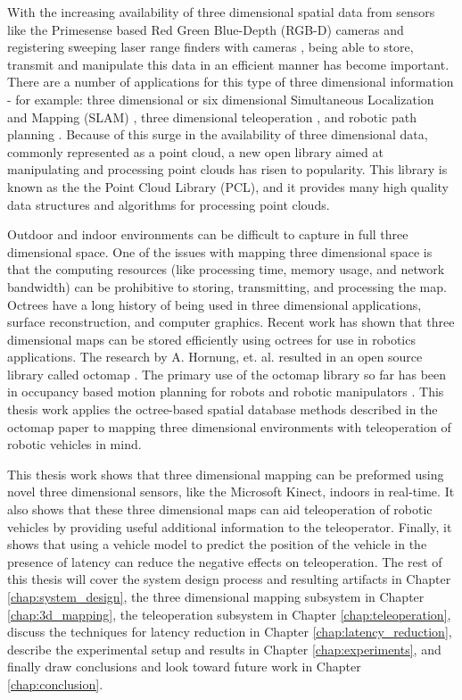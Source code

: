\documentclass[12pt]{report}
\begin{document}
With the increasing availability of three dimensional spatial data from sensors like the Primesense based Red Green Blue-Depth (RGB-D) cameras \cite{PRIMESENSE} and registering sweeping laser range finders with cameras \cite{photo_real}, being able to store, transmit and manipulate this data in an efficient manner has become important.  There are a number of applications for this type of three dimensional information - for example: three dimensional or six dimensional Simultaneous Localization and Mapping (SLAM) \cite{biswasdepth}, three dimensional teleoperation \cite{photo_real}, and robotic path planning \cite{3DCOLLISION}.  Because of this surge in the availability of three dimensional data, commonly represented as a point cloud, a new open library aimed at manipulating and processing point clouds has risen to popularity.  This library is known as the the Point Cloud Library (PCL)\cite{rusu20113d}, and it provides many high quality data structures and algorithms for processing point clouds.
  
Outdoor and indoor environments can be difficult to capture in full three dimensional space. One of the issues with mapping three dimensional space is that the computing resources (like processing time, memory usage, and network bandwidth) can be prohibitive to storing, transmitting, and processing the map. Octrees have a long history of being used in three dimensional applications\cite{boada2001multiresolution}, surface reconstruction\cite{kazhdan2006poisson}, and computer graphics\cite{fang1996deformable}. Recent work has shown that three dimensional maps can be stored efficiently using octrees for use in robotics applications\cite{octomap}. The research by A. Hornung, et. al. resulted in an open source library called octomap \cite{octomap}. The primary use of the octomap library so far has been in occupancy based motion planning for robots and robotic manipulators \cite{3DCOLLISION}. This thesis work applies the octree-based spatial database methods described in the octomap paper to mapping three dimensional environments with teleoperation of robotic vehicles in mind.


This thesis work shows that three dimensional mapping can be preformed using novel three dimensional sensors, like the Microsoft Kinect, indoors in real-time.  It also shows that these three dimensional maps can aid teleoperation of robotic vehicles by providing useful additional information to the teleoperator.  Finally, it shows that using a vehicle model to predict the position of the vehicle in the presence of latency can reduce the negative effects on teleoperation.  The rest of this thesis will cover the system design process and resulting artifacts in Chapter \ref{chap:system_design}, the three dimensional mapping subsystem in Chapter \ref{chap:3d_mapping}, the teleoperation subsystem in Chapter \ref{chap:teleoperation}, discuss the techniques for latency reduction in Chapter \ref{chap:latency_reduction}, describe the experimental setup and results in Chapter \ref{chap:experiments}, and finally draw conclusions and look toward future work in Chapter \ref{chap:conclusion}.
\end{document}
